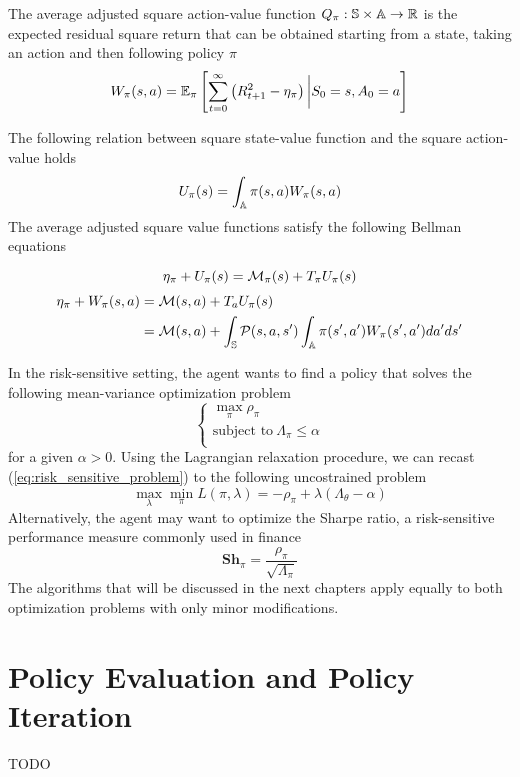 \begin{definition}
	The average adjusted square action-value function $Q_\pi : \S \times \A \to 
	\R$ is the expected residual square return that can be obtained starting from a
	state, taking an action and then following policy $\pi$
	\begin{equation}
		W_\pi(s, a) = \E[\pi]{\sum^{\infty}_{t=0} \left(R_{t+1}^2 -
			\eta_\pi\right) \bigg| S_0 = s, A_0 = a}
	\end{equation}
\end{definition}
The following relation between square state-value function and the square action-value holds
\begin{equation}\label{eq:UW_equality}
	U_\pi(s) = \int_\A \pi(s,a) W_\pi(s,a)
\end{equation}
The average adjusted square value functions satisfy the following Bellman equations
\begin{proposition}
	\begin{equation}
		\eta_\pi + U_\pi(s) = \calM_\pi(s) + T_\pi U_\pi(s)
	\end{equation}
	\begin{equation}
		\begin{split}
			\eta_\pi + W_\pi(s,a) &= \calM(s,a) + T_a U_\pi(s)\\
			&= \calM(s,a) + \int_{\S} \calP(s,a,s') \int_{\A} \pi(s',a') W_\pi(s',a') da' ds'
		\end{split}
	\end{equation}
\end{proposition}
In the risk-sensitive setting, the agent wants to find a policy that solves the 
following mean-variance optimization problem
\begin{equation}\label{eq:risk_sensitive_problem}
	\begin{cases}
		\max_\pi \rho_\pi\\
		\text{subject to}\ \Lambda_\pi \leq \alpha\\
	\end{cases}
\end{equation}
for a given $\alpha > 0$. Using the Lagrangian relaxation procedure, we can 
recast (\ref{eq:risk_sensitive_problem}) to the following uncostrained problem
\begin{equation}
	\max_\lambda \min_\pi L(\pi, \lambda) = - \rho_\pi + \lambda 
	(\Lambda_\theta - \alpha)
\end{equation}
Alternatively, the agent may want to optimize the Sharpe ratio, a risk-sensitive performance measure commonly used in finance
\begin{equation}
	\textbf{Sh}_\pi = \frac{\rho_\pi}{\sqrt{\Lambda_\pi}} 
\end{equation}
The algorithms that will be discussed in the next chapters apply equally to both optimization problems with only minor modifications. 

\section{Policy Evaluation and Policy Iteration}
\label{sec:policy_evaluation}
TODO